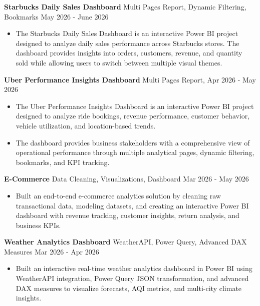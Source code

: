 \documentclass[11pt,letterpaper]{article}
\begin{document}
\textbf{Starbucks Daily Sales Dashboard} \textbar{} {Multi Pages Report, Dynamic Filtering, Bookmarks} \textbar{} \hfill May 2026 - June 2026
\begin{itemize}
    \item  The Starbucks Daily Sales Dashboard is an interactive Power BI project designed to analyze daily sales performance across Starbucks stores. The dashboard provides insights into orders, customers, revenue, and quantity sold while allowing users to switch between multiple visual themes.
\end{itemize}
\newline
\textbf{Uber Performance Insights Dashboard} \textbar{} {Multi Pages Report, } \textbar{} \hfill Apr 2026 - May 2026
\begin{itemize}
    \item  The Uber Performance Insights Dashboard is an interactive Power BI project designed to analyze ride bookings, revenue performance, customer behavior, vehicle utilization, and location-based trends.
    \item The dashboard provides business stakeholders with a comprehensive view of operational performance through multiple analytical pages, dynamic filtering, bookmarks, and KPI tracking.
\end{itemize}
\newline
\noindent
\textbf{E-Commerce} \textbar{} {Data Cleaning, Visualizations, Dashboard} \textbar{} \hfill Mar 2026 - May 2026
\begin{itemize}
    \item  Built an end-to-end e-commerce analytics solution by cleaning raw transactional data, modeling datasets, and creating an interactive Power BI dashboard with revenue tracking, customer insights, return analysis, and business KPIs.
\end{itemize}
\newline
\textbf{Weather Analytics Dashboard} \textbar{} {WeatherAPI, Power Query, Advanced DAX Measures} \textbar{} \hfill Mar 2026 - Apr 2026
\begin{itemize}
    \item  Built an interactive real-time weather analytics dashboard in Power BI using WeatherAPI integration, Power Query JSON transformation, and advanced DAX measures to visualize forecasts, AQI metrics, and multi-city climate insights.
\end{itemize}


    
\end{document}
